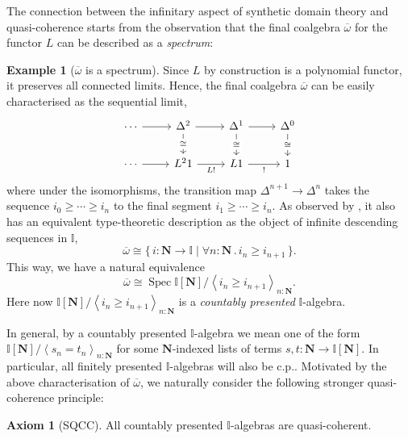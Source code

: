 \documentclass[a4paper,12pt]{amsart}
\theoremstyle{definition}
\newtheorem{example}[theorem]{Example}
\newtheorem*{axiom}{Axiom}
\newcommand{\mb}[1]{\mathbf{#1}}
\newcommand{\mbb}[1]{\mathbb{#1}}
\newcommand{\I}{\mbb I}
\newcommand{\ov}[1]{\overline{#1}}
\newcommand{\pair}[1]{\left\langle#1\right\rangle}
\newcommand{\scomp}[2]{\{\,#1\mid#2\,\}}
\newcommand{\N}{\mb N}
\newcommand{\fa}[2]{\forall #1\!\colon\!\!#2\mathpunct{.}}
\newcommand{\spec}{\operatorname{Spec}}
\begin{document}
The connection between the infinitary aspect of synthetic domain theory and quasi-coherence starts from the observation that the final coalgebra $\ov\omega$ for the functor $L$ can be described as a \emph{spectrum}:

\begin{example}[$\ov\omega$ is a spectrum]\label{exm:ovomegaaffine}
  Since $L$ by construction is a polynomial functor, it preserves all connected limits. Hence, the final coalgebra $\ov\omega$ can be easily characterised as the sequential limit, 
  \[\begin{tikzcd}
    \cdots & {\Delta^2} & {\Delta^1} & {\Delta^0} \\
    \cdots & {L^21} & L1 & 1
    \arrow[from=1-1, to=1-2]
    \arrow[from=1-2, to=1-3]
    \arrow["\cong"{description}, from=1-2, to=2-2]
    \arrow[from=1-3, to=1-4]
    \arrow["\cong"{description}, from=1-3, to=2-3]
    \arrow["\cong"{description}, from=1-4, to=2-4]
    \arrow[from=2-1, to=2-2]
    \arrow["{L!}"', from=2-2, to=2-3]
    \arrow["{!}"', from=2-3, to=2-4]
  \end{tikzcd}\]
  where under the isomorphisms, the transition map $\Delta^{n+1} \to \Delta^n$ takes the sequence $i_0 \ge \cdots \ge i_n$ to the final segment $i_1 \ge \cdots \ge i_n$. As observed by \citet[Sec. 5.2]{hyland1990first}, it also has an equivalent type-theoretic description as the object of infinite descending sequences in $\I$,
  \[ \ov\omega \cong \scomp{i : \N \to \I}{\fa n\N i_n \ge i_{n+1}}. \]
  This way, we have a natural equivalence
  \[ \ov\omega \cong \spec\I[\N]/\pair{i_n \ge i_{n+1}}_{n:\N}. \]
  Here now $\I[\N]/\pair{i_n \ge i_{n+1}}_{n:\N}$ is a \emph{countably presented} $\I$-algebra.
\end{example}

In general, by a countably presented $\I$-algebra we mean one of the form $\I[\N]/\pair{s_n = t_n}_{n:\N}$ for some $\N$-indexed lists of terms $s,t \colon \N \to \I[\N]$. In particular, all finitely presented $\I$-algebras will also be c.p.. Motivated by the above characterisation of $\ov\omega$, we naturally consider the following stronger quasi-coherence principle:

\begin{axiom}[SQCC]
  All countably presented $\I$-algebras are quasi-coherent.
\end{axiom}
\end{document}
